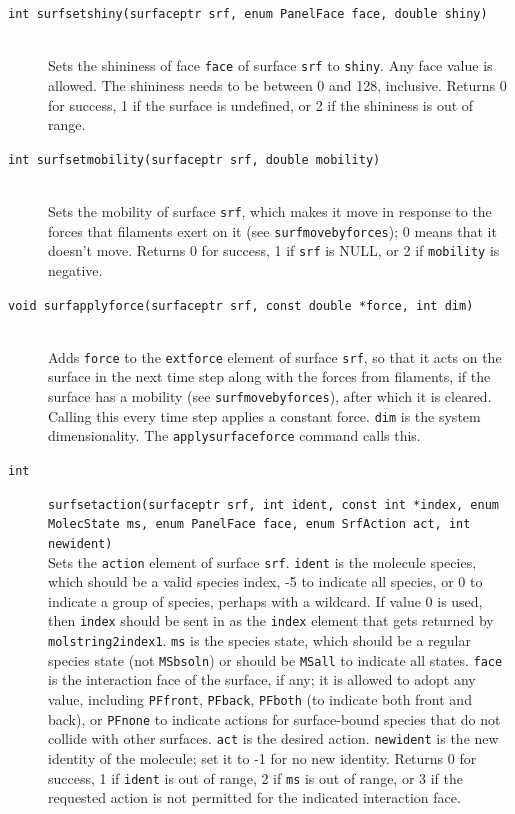 \documentclass {scrbook}
\newcommand {\ttt} {\texttt}
\begin{document}
\begin{description}
\item[\ttt{int surfsetshiny(surfaceptr srf, enum PanelFace face, double shiny)}]
\hfill \\
Sets the shininess of face \ttt{face} of surface \ttt{srf} to \ttt{shiny}. Any face value is allowed. The shininess needs to be between 0 and 128, inclusive. Returns 0 for success, 1 if the surface is undefined, or 2 if the shininess is out of range.

\item[\ttt{int surfsetmobility(surfaceptr srf, double mobility)}]
\hfill \\
Sets the mobility of surface \ttt{srf}, which makes it move in response to the forces that filaments exert on it (see \ttt{surfmovebyforces}); 0 means that it doesn't move. Returns 0 for success, 1 if \ttt{srf} is NULL, or 2 if \ttt{mobility} is negative.

\item[\ttt{void surfapplyforce(surfaceptr srf, const double *force, int dim)}]
\hfill \\
Adds \ttt{force} to the \ttt{extforce} element of surface \ttt{srf}, so that it acts on the surface in the next time step along with the forces from filaments, if the surface has a mobility (see \ttt{surfmovebyforces}), after which it is cleared. Calling this every time step applies a constant force. \ttt{dim} is the system dimensionality. The \ttt{applysurfaceforce} command calls this.

\item[\ttt{int}]
\ttt{surfsetaction(surfaceptr srf, int ident, const int *index, enum MolecState ms, enum PanelFace face, enum SrfAction act, int newident)}
\hfill \\
Sets the \ttt{action} element of surface \ttt{srf}. \ttt{ident} is the molecule species, which should be a valid species index, -5 to indicate all species, or 0 to indicate a group of species, perhaps with a wildcard. If value 0 is used, then \ttt{index} should be sent in as the \ttt{index} element that gets returned by \ttt{molstring2index1}. \ttt{ms} is the species state, which should be a regular species state (not \ttt{MSbsoln}) or should be \ttt{MSall} to indicate all states. \ttt{face} is the interaction face of the surface, if any; it is allowed to adopt any value, including \ttt{PFfront}, \ttt{PFback}, \ttt{PFboth} (to indicate both front and back), or \ttt{PFnone} to indicate actions for surface-bound species that do not collide with other surfaces. \ttt{act} is the desired action. \ttt{newident} is the new identity of the molecule; set it to -1 for no new identity. Returns 0 for success, 1 if \ttt{ident} is out of range, 2 if \ttt{ms} is out of range, or 3 if the requested action is not permitted for the indicated interaction face.


\end{description}
\end{document}
